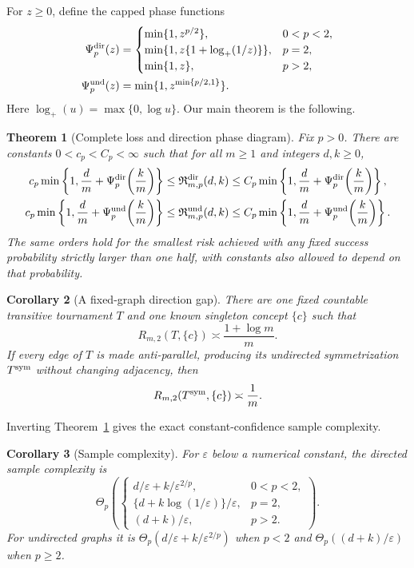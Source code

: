 \documentclass{article}
\newtheorem{theorem}{Theorem}
\newtheorem{corollary}[theorem]{Corollary}
\theoremstyle{definition}
\theoremstyle{remark}
\newcommand{\phase}{\Psi}
\begin{document}
For $z\geq0$, define the capped phase functions
\begin{align}
\phase_p^{\rm dir}(z)&=
\begin{cases}
\min\{1,z^{p/2}\},&0<p<2,\\
\min\{1,z\{1+\log_+(1/z)\}\},&p=2,\\
\min\{1,z\},&p>2,
\end{cases} \label{eq:dirphase}\\
\phase_p^{\rm und}(z)&=\min\{1,z^{\min\{p/2,1\}}\}. \label{eq:undphase}
\end{align}
Here $\log_+(u)=\max\{0,\log u\}$. Our main theorem is the following.

\begin{theorem}[Complete loss and direction phase diagram]
\label{thm:main}
Fix $p>0$. There are constants $0<c_p<C_p<\infty$ such that for all $m\geq1$ and integers $d,k\geq0$,
\begin{align}
c_p\min\left\{1,\frac dm+\phase_p^{\rm dir}\!\left(\frac km\right)\right\}
&\leq \mathfrak R^{\rm dir}_{m,p}(d,k)
\leq C_p\min\left\{1,\frac dm+\phase_p^{\rm dir}\!\left(\frac km\right)\right\}, \label{eq:main-dir}\\
c_p\min\left\{1,\frac dm+\phase_p^{\rm und}\!\left(\frac km\right)\right\}
&\leq \mathfrak R^{\rm und}_{m,p}(d,k)
\leq C_p\min\left\{1,\frac dm+\phase_p^{\rm und}\!\left(\frac km\right)\right\}. \label{eq:main-und}
\end{align}
The same orders hold for the smallest risk achieved with any fixed success probability strictly larger than one half, with constants also allowed to depend on that probability.
\end{theorem}

\begin{corollary}[A fixed-graph direction gap]
\label{cor:fixed-gap}
There are one fixed countable transitive tournament $T$ and one known singleton concept $\{c\}$ such that \[ R_{m,2}(T,\{c\})\asymp\frac{1+\log m}{m}. \] If every edge of $T$ is made anti-parallel, producing its undirected symmetrization $T^{\rm sym}$ without changing adjacency, then \[ R_{m,2}(T^{\rm sym},\{c\})\asymp\frac1m. \]
\end{corollary}

Inverting Theorem~\ref{thm:main} gives the exact constant-confidence sample complexity.

\begin{corollary}[Sample complexity]
\label{cor:sample}
For $\varepsilon$ below a numerical constant, the directed sample complexity is \[ \Theta_p\left(
\begin{cases}
d/\varepsilon+k/\varepsilon^{2/p},&0<p<2,\\
\{d+k\log(1/\varepsilon)\}/\varepsilon,&p=2,\\
(d+k)/\varepsilon,&p>2.
\end{cases}\right).
\] For undirected graphs it is $\Theta_p(d/\varepsilon+k/\varepsilon^{2/p})$ when $p<2$ and $\Theta_p((d+k)/\varepsilon)$ when $p\geq2$.
\end{corollary}
\end{document}
